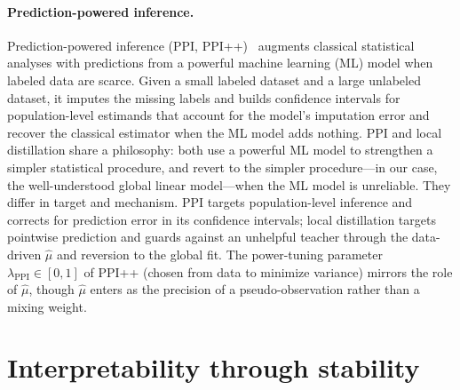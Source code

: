 \documentclass[12pt]{article}
\theoremstyle{definition}
\begin{document}

\paragraph{Prediction-powered inference.}
Prediction-powered inference (PPI, PPI++)~\cite{angelopoulos2023ppi, angelopoulos2023ppipp} augments classical statistical analyses with predictions from a powerful machine learning (ML) model when labeled data are scarce. Given a small labeled dataset and a large unlabeled dataset, it imputes the missing labels and builds confidence intervals for population-level estimands that account for the model's imputation error and recover the classical estimator when the ML model adds nothing.
PPI and local distillation share a philosophy: both use a powerful ML model to strengthen a simpler statistical procedure, and revert to the simpler procedure---in our case, the well-understood global linear model---when the ML model is unreliable. They differ in target and mechanism. PPI targets population-level inference and corrects for prediction error in its confidence intervals; local distillation targets pointwise prediction and guards against an unhelpful teacher through the data-driven $\hat\mu$ and reversion to the global fit. The power-tuning parameter $\lambda_{\text{PPI}}\in [0,1]$ of PPI++ (chosen from data to minimize variance) mirrors the role of $\hat\mu$, though $\hat\mu$ enters as the precision of a pseudo-observation rather than a mixing weight.

\section{Interpretability through stability}
\label{sec:interpretation}
\end{document}

